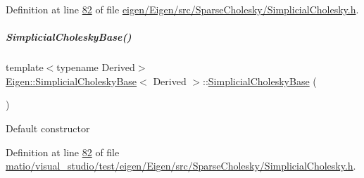 Definition at line \hyperlink{eigen_2_eigen_2src_2_sparse_cholesky_2_simplicial_cholesky_8h_source_l00082}{82} of file \hyperlink{eigen_2_eigen_2src_2_sparse_cholesky_2_simplicial_cholesky_8h_source}{eigen/\+Eigen/src/\+Sparse\+Cholesky/\+Simplicial\+Cholesky.\+h}.

\mbox{\label{group___sparse_cholesky___module_a098baba1dbe07ca3a775c8df1f8a0e71}} 
\subparagraph{\texorpdfstring{Simplicial\+Cholesky\+Base()}{SimplicialCholeskyBase()}\hspace{0.1cm}{\footnotesize\ttfamily [2/2]}}
{\footnotesize\ttfamily template$<$typename Derived$>$ \\
\hyperlink{group___sparse_cholesky___module_class_eigen_1_1_simplicial_cholesky_base}{Eigen\+::\+Simplicial\+Cholesky\+Base}$<$ Derived $>$\+::\hyperlink{group___sparse_cholesky___module_class_eigen_1_1_simplicial_cholesky_base}{Simplicial\+Cholesky\+Base} (\begin{DoxyParamCaption}{ }\end{DoxyParamCaption})\hspace{0.3cm}{\ttfamily [inline]}}

Default constructor 

Definition at line \hyperlink{matio_2visual__studio_2test_2eigen_2_eigen_2src_2_sparse_cholesky_2_simplicial_cholesky_8h_source_l00082}{82} of file \hyperlink{matio_2visual__studio_2test_2eigen_2_eigen_2src_2_sparse_cholesky_2_simplicial_cholesky_8h_source}{matio/visual\+\_\+studio/test/eigen/\+Eigen/src/\+Sparse\+Cholesky/\+Simplicial\+Cholesky.\+h}.



